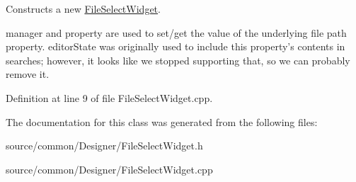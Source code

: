 Constructs a new \hyperlink{class_file_select_widget}{File\-Select\-Widget}. 

manager and property are used to set/get the value of the underlying file path property. editor\-State was originally used to include this property's contents in searches; however, it looks like we stopped supporting that, so we can probably remove it. 

Definition at line 9 of file File\-Select\-Widget.\-cpp.



The documentation for this class was generated from the following files\-:\begin{DoxyCompactItemize}
\item 
source/common/\-Designer/File\-Select\-Widget.\-h\item 
source/common/\-Designer/File\-Select\-Widget.\-cpp\end{DoxyCompactItemize}
